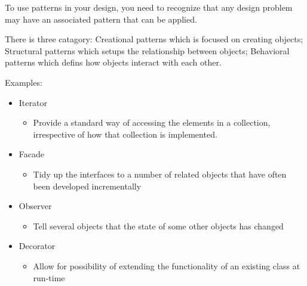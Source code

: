 \documentclass{article}
\begin{document}
    To use patterns in your design, you need to recognize that any design problem may have 
    an associated pattern that can be applied.

    There is three catagory: Creational patterns which is focused on creating objects; 
    Structural patterns which setups the relationship between objects; Behavioral patterns 
    which defins how objects interact with each other.

    Examples: 
    \begin{itemize}
        \item Iterator 
        \begin{itemize}
            \item Provide a standard way of accessing the elements in a collection,
            irrespective of how that collection is implemented.
        \end{itemize}
        \item Facade
        \begin{itemize}
            \item Tidy up the interfaces to a number of related objects that have often been 
            developed incrementally
        \end{itemize}
        \item Observer
        \begin{itemize}
            \item Tell several objects that the state of some other objects has changed 
        \end{itemize}
        \item Decorator
        \begin{itemize}
            \item Allow for possibility of extending the functionality of an existing class at 
            run-time
        \end{itemize}
    \end{itemize}
\end{document}
